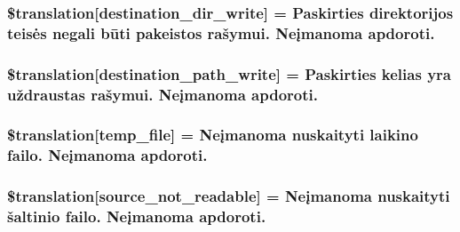 \subsubsection[{\$translation}]{\setlength{\rightskip}{0pt plus 5cm}\$translation\mbox{[}\textquotesingle{}destination\+\_\+dir\+\_\+write\textquotesingle{}\mbox{]} = \textquotesingle{}Paskirties direktorijos teisės negali būti pakeistos rašymui. Neįmanoma apdoroti.\textquotesingle{}}\label{class_8upload_8lt___l_t_8php_a97608ea194a616db49141a0e6dee900c}
\hypertarget{class_8upload_8lt___l_t_8php_a40e4e1962226b89fd76da5819a9602b0}{}
\subsubsection[{\$translation}]{\setlength{\rightskip}{0pt plus 5cm}\$translation\mbox{[}\textquotesingle{}destination\+\_\+path\+\_\+write\textquotesingle{}\mbox{]} = \textquotesingle{}Paskirties kelias yra uždraustas rašymui. Neįmanoma apdoroti.\textquotesingle{}}\label{class_8upload_8lt___l_t_8php_a40e4e1962226b89fd76da5819a9602b0}
\hypertarget{class_8upload_8lt___l_t_8php_a2baece8da11e20d45175db91851ec3e3}{}
\subsubsection[{\$translation}]{\setlength{\rightskip}{0pt plus 5cm}\$translation\mbox{[}\textquotesingle{}temp\+\_\+file\textquotesingle{}\mbox{]} = \textquotesingle{}Neįmanoma nuskaityti laikino failo. Neįmanoma apdoroti.\textquotesingle{}}\label{class_8upload_8lt___l_t_8php_a2baece8da11e20d45175db91851ec3e3}
\hypertarget{class_8upload_8lt___l_t_8php_a922967ca2df0efdd455261142d8e5715}{}
\subsubsection[{\$translation}]{\setlength{\rightskip}{0pt plus 5cm}\$translation\mbox{[}\textquotesingle{}source\+\_\+not\+\_\+readable\textquotesingle{}\mbox{]} = \textquotesingle{}Neįmanoma nuskaityti šaltinio failo. Neįmanoma apdoroti.\textquotesingle{}}\label{class_8upload_8lt___l_t_8php_a922967ca2df0efdd455261142d8e5715}
\hypertarget{class_8upload_8lt___l_t_8php_a346dfd1ade29f583dd20d345c436859f}{}

